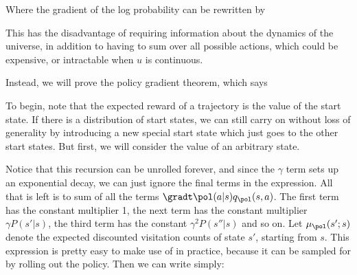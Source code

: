 \documentclass[12pt]{article}
\begin{document}
Where the gradient of the log probability can be rewritten by

This has the disadvantage of requiring information about the dynamics of the universe, in addition to having to sum over all possible actions, which could be expensive, or intractable when $u$ is continuous.

Instead, we will prove the policy gradient theorem, which says


To begin, note that the expected reward of a trajectory is the value of the start state. If there is a distribution of start states, we can still carry on without loss of generality by introducing a new special start state which just goes to the other start states. But first, we will consider the value of an arbitrary state.


Notice that this recursion can be unrolled forever, and since the $\gamma$ term sets up an exponential decay, we can just ignore the final terms in the expression. All that is left is to sum of all the terms $\gradt \pol(a|s) q_{\pol}(s, a)$. The first term has the constant multiplier 1, the next term has the constant multiplier $\gamma P(s'|s)$, the third term has the constant $\gamma^2 P(s''|s)$ and so on. Let $\mu_{\pol}(s';s)$ denote the expected discounted visitation counts of state $s'$, starting from $s$. This expression is pretty easy to make use of in practice, because it can be sampled for by rolling out the policy. Then we can write simply:
\end{document}
